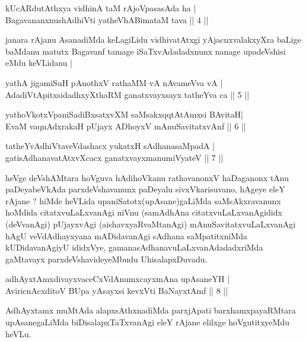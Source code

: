 \begin{shl}
kUcARdutAthxya vidhinA taM rAjoVpasasAda ha |\\
BagavananxnushAdhiVti yatheVhABimataM tava \hfill || 4 || 
\end{shl}

\begin{artha}
janara rAjanu AsanadiMda keLagiLidu vidhivatAtxgi yAjacnxvalakxyXra baLige baMdanu matutx Bagavanf tamage iSaTxvAdadadxnunx nanage upadeVshisi eMdu keVLidanu |
\end{artha}


\begin{shl}
yathA jigamiSuH pAnothxV rathaMM vA nAvameVva vA |\\
AdadiVtA\s \s pitxsidadhxyXthaRM ganatxvayxsayx tatheYva ca \hfill || 5 || 
\end{shl}

\begin{shl}
yathoVkotxVpaniSadiBxsatxvXM saMsakxqqtAtAmx\s si BAvitaH|\\
EvaM vaqnAdxrakaH pUjayx ADhoyxV mAnuSavitatxvAnf \hfill || 6 || 
\end{shl}

\begin{shl}
tatheYvAdhiVtaveVdashacx yukatxH sAdhanasaMpadA |\\
gatisAdhanavatAtxvXcacx ganatxvayxmanumiVyateV \hfill || 7 || 
\end{shl}

\begin{artha}
heVge deVshAMtara hoVguva hAdihoVkanu rathavanonxV haDaganonx tAnu paDeyabeVkAda parxdeVshavanunx paDeyalu sivxVkarisuvano, hAgeye eleY rAjane ? hiMde heVLida upaniSatotx(upAsane)gaLiMda saMsAkxravanunx hoMdida citatxvuLaLxvanAgi niVnu (samAdhAna citatxvuLaLxvanAgididx (deVvanAgi) pUjayxvAgi (aishavxyaRvaMtanAgi) mAnuSavitatxvuLaLxvanAgi hAgU veVdAdhayxyana mADidavanAgi sAdhana saMpatitxniMda kUDidavanAgiyU ididxVye, gamanasAdhanavuLaLxvanAdadadxriMda gaMtavayx parxdeVshavideyeMbudu UhisalapxDuvadu.
\end{artha}

\begin{shl}
adhAyxtAmxdivayxvaceCxVdAnumxcayxmAna upAsaneYH |\\
AviricnAcxditoV BUpa yAsayxsi kevxVti BaNayxtAmf \hfill || 8 || 
\end{shl}

\begin{artha}
AdhAyxtamx muMtAda alapxsAthxnadiMda parxjApati barxhamxpayaRMtara upAsanegaLiMda biDisalapxTaTxvanAgi eleY rAjane elilxge hoVgutitxyeMdu heVLu.
\end{artha}

